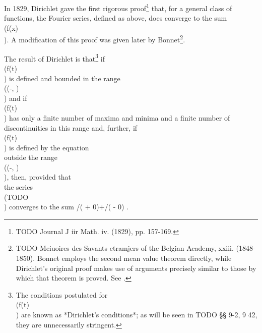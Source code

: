 %
%

In 1829, Dirichlet gave the first rigorous proof\footnote{TODO Journal J iir Math. iv. (1829), pp. 157-169.}
that, for a general class of functions, the Fourier series, defined as above, does
converge to the sum \\(f(x)\\). A modification of this proof was given later
by Bonnet\footnote{TODO Meiuoires des Savants etramjers of the Belgian Academy, xxiii.
(1848-1850). Bonnet employs the second mean value theorem directly,
while Dirichlet's original proof makes use of arguments precisely
similar to those by which that theorem is proved. See .}.

The result of Dirichlet
is that\footnote{The conditions postulated for \\(f(t)\\)
  are known as *Dirichlet's conditions*; as will be seen in TODO §§ 9-2, 9 42, they are unnecessarily
  stringent.}
if \\(f(t)\\) is defined and bounded in the
range \\((-\pi, \pi)\\) and if \\(f(t)\\) has only a finite number of maxima and
minima and a finite number of discontinuities in this range and,
further, if \\(f(t)\\) is defined by the equation
\\[ 
f(t + 2 \pi) = f(t)
\\] 
outside the range \\((-\pi, \pi)\\), then, provided that
\\[ 
\pi a_{n}
=
\int_{-\pi}^{\pi}\! f(t) \cos nt \, d t,
\quad
\pi b_{n}
=
\int_{-\pi}^{\pi}\! f(t) \sin nt \, d t,
\\] 
the series \\(TODO\\) converges to the sum /( +
0)+/( - 0) .

